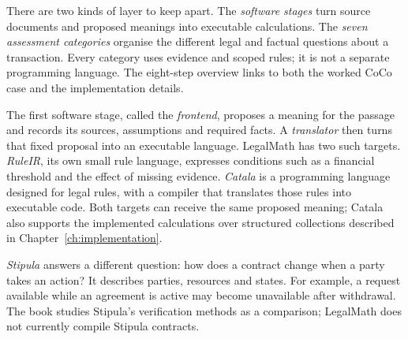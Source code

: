 \documentclass[12pt,a4paper,oneside,openany]{book}
\begin{document}
There are two kinds of layer to keep apart. The \emph{software stages} turn
source documents and proposed meanings into executable calculations. The
\emph{seven assessment categories} organise the different legal and factual
questions about a transaction. Every category uses evidence and scoped rules;
it is not a separate programming language. The eight-step overview links to
both the worked CoCo case and the implementation details.

The first software stage, called the \emph{frontend}, proposes a meaning for the
passage and records its sources, assumptions and required facts. A
\emph{translator} then turns that fixed proposal into an executable language.
LegalMath has two such targets. \emph{RuleIR}, its own small rule language,
expresses conditions such as a financial threshold and the effect of missing
evidence. \emph{Catala} is a programming language designed for legal rules,
with a compiler that translates those rules into executable code. Both targets
can receive the same proposed meaning; Catala also supports the implemented
calculations over structured collections described in Chapter~\ref{ch:implementation}.

\emph{Stipula} answers a different question: how does a contract change when a
party takes an action? It describes parties, resources and states. For example,
a request available while an agreement is active may become unavailable after
withdrawal. The book studies Stipula's verification methods as a comparison;
LegalMath does not currently compile Stipula contracts.
\end{document}
